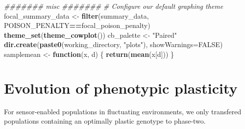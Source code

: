 \documentclass[]{book}
\newenvironment{Shaded}{\begin{snugshade}}{\end{snugshade}}
\newcommand{\CommentTok}[1]{\textcolor[rgb]{0.56,0.35,0.01}{\textit{#1}}}
\newcommand{\ControlFlowTok}[1]{\textcolor[rgb]{0.13,0.29,0.53}{\textbf{#1}}}
\newcommand{\DataTypeTok}[1]{\textcolor[rgb]{0.13,0.29,0.53}{#1}}
\newcommand{\KeywordTok}[1]{\textcolor[rgb]{0.13,0.29,0.53}{\textbf{#1}}}
\newcommand{\NormalTok}[1]{#1}
\newcommand{\OperatorTok}[1]{\textcolor[rgb]{0.81,0.36,0.00}{\textbf{#1}}}
\newcommand{\OtherTok}[1]{\textcolor[rgb]{0.56,0.35,0.01}{#1}}
\newcommand{\StringTok}[1]{\textcolor[rgb]{0.31,0.60,0.02}{#1}}
\begin{document}
\begin{Shaded}
\begin{Highlighting}[]
\CommentTok{####### misc #######}
\CommentTok{# Configure our default graphing theme}
\NormalTok{focal_summary_data <-}\StringTok{ }\KeywordTok{filter}\NormalTok{(summary_data, POISON_PENALTY}\OperatorTok{==}\NormalTok{focal_poison_penalty)}
\KeywordTok{theme_set}\NormalTok{(}\KeywordTok{theme_cowplot}\NormalTok{())}
\NormalTok{cb_palette <-}\StringTok{ "Paired"}
\KeywordTok{dir.create}\NormalTok{(}\KeywordTok{paste0}\NormalTok{(working_directory, }\StringTok{"plots"}\NormalTok{), }\DataTypeTok{showWarnings=}\OtherTok{FALSE}\NormalTok{)}
\NormalTok{samplemean <-}\StringTok{ }\ControlFlowTok{function}\NormalTok{(x, d) \{}
  \KeywordTok{return}\NormalTok{(}\KeywordTok{mean}\NormalTok{(x[d]))}
\NormalTok{\}}
\end{Highlighting}
\end{Shaded}

\hypertarget{evolution-of-phenotypic-plasticity-1}{%
\section{Evolution of phenotypic plasticity}\label{evolution-of-phenotypic-plasticity-1}}

For sensor-enabled populations in fluctuating environments, we only transfered populations containing an optimally plastic genotype to phase-two.
\end{document}
